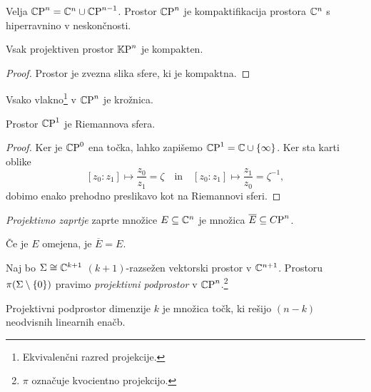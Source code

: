 \begin{opomba}
Velja $\mathbb{C}\!\operatorname{P}^{n} = \mathbb{C}^n \cup \mathbb{C}\!\operatorname{P}^{n-1}$. Prostor
$\mathbb{C}\!\operatorname{P}^{n}$ je kompaktifikacija prostora $\mathbb{C}^n$ s hiperravnino v
neskončnosti.
\end{opomba}

\begin{trditev}
Vsak projektiven prostor $\mathbb{K}\!\operatorname{P}^{n}$ je kompakten.
\end{trditev}

\begin{proof}
Prostor je zvezna slika sfere, ki je kompaktna.
\end{proof}

\begin{opomba}
Vsako vlakno\footnote{Ekvivalenčni razred projekcije.} v
$\mathbb{C}\!\operatorname{P}^{n}$ je krožnica.
\end{opomba}

\begin{trditev}
Prostor $\mathbb{C}\!\operatorname{P}^{1}$ je Riemannova sfera.
\end{trditev}

\begin{proof}
Ker je $\mathbb{C}\!\operatorname{P}^{0}$ ena točka, lahko zapišemo
$\mathbb{C}\!\operatorname{P}^{1} = \mathbb{C} \cup \left\{\infty\right\}$. Ker sta karti oblike
\[
[z_0 : z_1] \mapsto \frac{z_0}{z_1} = \zeta
\quad \text{in} \quad
[z_0 : z_1] \mapsto \frac{z_1}{z_0} = \zeta^{-1},
\]
dobimo enako prehodno preslikavo kot na Riemannovi sferi.
\end{proof}

\begin{definicija}
\emph{Projektivno zaprtje}
zaprte množice $E \subseteq \mathbb{C}^n$ je množica
$\overline{E} \subseteq C\!\operatorname{P}^{n}$.
\end{definicija}

\begin{opomba}
Če je $E$ omejena, je $\overline{E} = E$.
\end{opomba}


\begin{definicija}
Naj bo $\Sigma \cong \mathbb{C}^{k+1}$ $(k+1)$-razsežen vektorski prostor v
$\mathbb{C}^{n+1}$. Prostoru $\pi(\Sigma \setminus \left\{0\right\})$ pravimo
\emph{projektivni podprostor}
v $\mathbb{C}\!\operatorname{P}^{n}$.\footnote{$\pi$ označuje kvocientno projekcijo.}
\end{definicija}

\begin{opomba}
Projektivni podprostor dimenzije $k$ je množica točk, ki rešijo
$(n-k)$ neodvisnih linearnih enačb.
\end{opomba}

